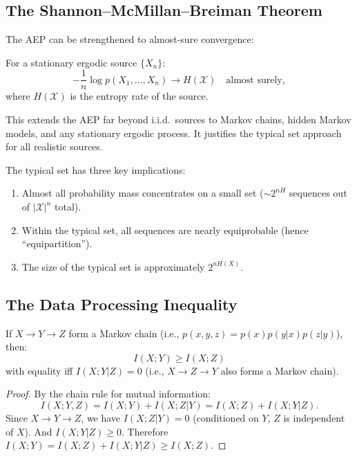 \subsection{The Shannon--McMillan--Breiman Theorem}

The AEP can be strengthened to almost-sure convergence:

\begin{theorem}
For a stationary ergodic source $\{X_n\}$:
\[
-\frac{1}{n}\log p(X_1,\dots,X_n) \to H(\mathcal{X}) \quad \text{almost surely},
\]
where $H(\mathcal{X})$ is the entropy rate of the source.
\end{theorem}

This extends the AEP far beyond i.i.d.\ sources to Markov chains, hidden Markov models, and any stationary ergodic process. It justifies the typical set approach for all realistic sources.

The typical set has three key implications:
\begin{enumerate}
\item Almost all probability mass concentrates on a small set ($\sim 2^{nH}$ sequences out of $|\mathcal{X}|^n$ total).
\item Within the typical set, all sequences are nearly equiprobable (hence ``equipartition'').
\item The size of the typical set is approximately $2^{nH(X)}$.
\end{enumerate}

\subsection{The Data Processing Inequality}
\label{sec:information:dpi}

\begin{theorem}
If $X \to Y \to Z$ form a Markov chain (i.e., $p(x,y,z) = p(x)p(y|x)p(z|y)$), then:
\[
I(X;Y) \ge I(X;Z)
\]
with equality iff $I(X;Y|Z) = 0$ (i.e., $X \to Z \to Y$ also forms a Markov chain).
\end{theorem}

\begin{proof}
By the chain rule for mutual information:
\[
I(X;Y,Z) = I(X;Y) + I(X;Z|Y) = I(X;Z) + I(X;Y|Z).
\]
Since $X \to Y \to Z$, we have $I(X;Z|Y)=0$ (conditioned on $Y$, $Z$ is independent of $X$). And $I(X;Y|Z) \ge 0$. Therefore $I(X;Y) = I(X;Z) + I(X;Y|Z) \ge I(X;Z)$.
\end{proof}

